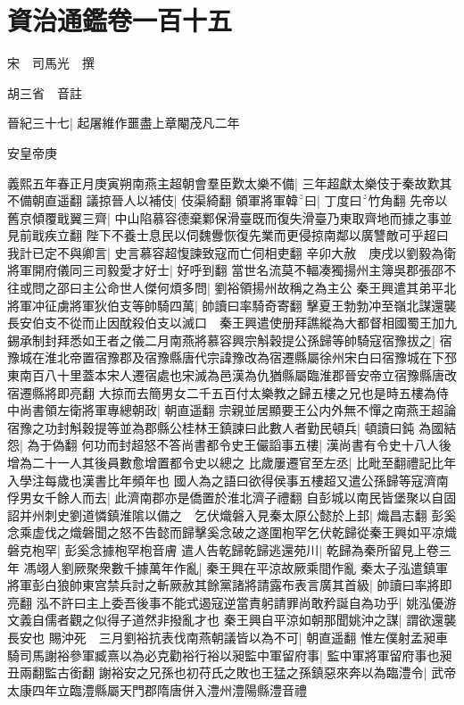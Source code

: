 \section{資治通鑑卷一百十五}
宋　司馬光　撰

胡三省　音註

晉紀三十七|{
	起屠維作噩盡上章閹茂凡二年}


安皇帝庚

義熙五年春正月庚寅朔南燕主超朝會羣臣歎太樂不備|{
	三年超獻太樂伎于秦故歎其不備朝直遥翻}
議掠晉人以補伎|{
	伎渠綺翻}
領軍將軍韓曰|{
	丁度曰竹角翻}
先帝以舊京傾覆戢翼三齊|{
	中山陷慕容德棄鄴保滑臺既而復失滑臺乃東取齊地而據之事並見前戢疾立翻}
陛下不養士息民以伺魏釁恢復先業而更侵掠南鄰以廣讐敵可乎超曰我計已定不與卿言|{
	史言慕容超愎諫致寇而亡伺相吏翻}
辛卯大赦　庚戌以劉毅為衛將軍開府儀同三司毅愛才好士|{
	好呼到翻}
當世名流莫不輻凑獨揚州主簿吳郡張邵不往或問之邵曰主公命世人傑何煩多問|{
	劉裕領揚州故稱之為主公}
秦王興遣其弟平北將軍冲征虜將軍狄伯支等帥騎四萬|{
	帥讀曰率騎奇寄翻}
擊夏王勃勃冲至嶺北謀還襲長安伯支不從而止因酖殺伯支以滅口　秦王興遣使册拜譙縱為大都督相國蜀王加九錫承制封拜悉如王者之儀二月南燕將慕容興宗斛穀提公孫歸等帥騎寇宿豫拔之|{
	宿豫城在淮北帝置宿豫郡及宿豫縣唐代宗諱豫改為宿遷縣屬徐州宋白曰宿豫城在下邳東南百八十里蓋本宋人遷宿處也宋滅為邑漢為仇猶縣屬臨淮郡晉安帝立宿豫縣唐改宿遷縣將即亮翻}
大掠而去簡男女二千五百付太樂教之歸五樓之兄也是時五樓為侍中尚書領左衛將軍專總朝政|{
	朝直遥翻}
宗親並居顯要王公内外無不憚之南燕王超論宿豫之功封斛穀提等並為郡縣公桂林王鎮諫曰此數人者勤民頓兵|{
	頓讀曰鈍}
為國結怨|{
	為于偽翻}
何功而封超怒不答尚書都令史王儼謟事五樓|{
	漢尚書有令史十八人後增為二十一人其後員數愈增置都令史以總之}
比歲屢遷官至左丞|{
	比毗至翻禮記比年入學注每歲也漢書比年頻年也}
國人為之語曰欲得侯事五樓超又遣公孫歸等寇濟南俘男女千餘人而去|{
	此濟南郡亦是僑置於淮北濟子禮翻}
自彭城以南民皆堡聚以自固詔并州刺史劉道憐鎮淮隂以備之　乞伏熾磐入見秦太原公懿於上邽|{
	熾昌志翻}
彭奚念乘虚伐之熾磐聞之怒不告懿而歸擊奚念破之遂圍枹罕乞伏乾歸從秦王興如平凉熾磐克枹罕|{
	彭奚念據枹罕枹音膚}
遣人告乾歸乾歸逃還苑川|{
	乾歸為秦所留見上卷三年}
馮翊人劉厥聚衆數千據萬年作亂|{
	秦王興在平涼故厥乘間作亂}
秦太子泓遣鎮軍將軍彭白狼帥東宫禁兵討之斬厥赦其餘黨諸將請露布表言廣其首級|{
	帥讀曰率將即亮翻}
泓不許曰主上委吾後事不能式遏寇逆當責躬請罪尚敢矜誕自為功乎|{
	姚泓優游文義自儒者觀之似得子道然非撥亂才也}
秦王興自平涼如朝那聞姚沖之謀|{
	謂欲還襲長安也}
賜沖死　三月劉裕抗表伐南燕朝議皆以為不可|{
	朝直遥翻}
惟左僕射孟昶車騎司馬謝裕參軍臧熹以為必克勸裕行裕以昶監中軍留府事|{
	監中軍將軍留府事也昶丑兩翻監古銜翻}
謝裕安之兄孫也初苻氏之敗也王猛之孫鎮惡來奔以為臨澧令|{
	武帝太康四年立臨澧縣屬天門郡隋唐併入澧州澧陽縣澧音禮}
